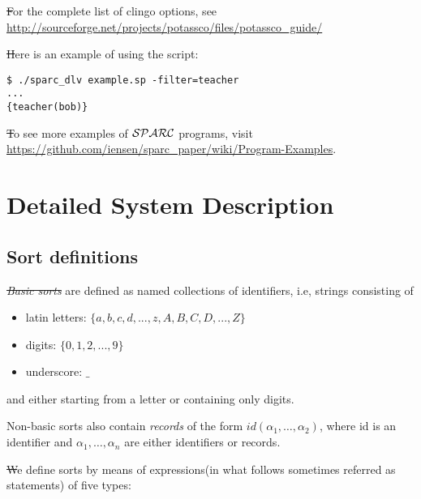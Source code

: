 \documentclass[12pt, letterpaper]{article}
\begin{document}
\st
For the complete list of clingo options, see 
\url{http://sourceforge.net/projects/potassco/files/potassco_guide/}


\st
Here is an example of using the script:
\begin{verbatim}
$ ./sparc_dlv example.sp -filter=teacher
...
{teacher(bob)}
\end{verbatim}
\st To see more examples of ${\cal SPARC}$ programs, visit \url{https://github.com/iensen/sparc_paper/wiki/Program-Examples}.
\section{Detailed System Description}

\subsection{Sort definitions}\label{ss}



\st \textit{Basic sorts} are defined as named collections of identifiers, i.e, strings consisting of
\begin{itemize}
 \item latin letters: $\{a,b,c,d,...,z,A,B,C,D,...,Z\}$
 \item digits: $\{0,1,2,...,9\}$
 \item underscore: $\_$
\end{itemize}
and either starting from a letter or containing only digits.

Non-basic sorts also contain \textit{records} of the form $id(\alpha_1,\dots, \alpha_2)$, where id is an identifier and 
$\alpha_1, \dots, \alpha_n$ are either identifiers or records. 


\st We define sorts by means of expressions(in what follows sometimes referred as statements) of five types:
\end{document}
